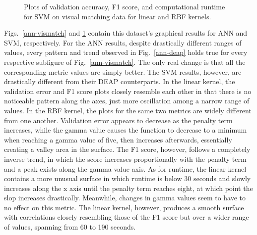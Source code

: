 \documentclass[12pt]{uthesis-v12}  %
\begin{document}
\begin{figure}
	\hfill	
{}
						
\caption{Plots of validation accuracy, F1 score, and computational runtime for SVM on visual matching data for linear and RBF kernels.}
	\label{svm-vismatch}
	\end{figure}
	
Figs.~\ref{ann-vismatch} and \ref{svm-vismatch} contain this dataset's graphical results for ANN and SVM, respectively. For the ANN results, despite drastically different ranges of values, every pattern and trend observed in Fig.~\ref{ann-deap} holds true for every respective subfigure of Fig.~\ref{ann-vismatch}. The only real change is that all the corresponding metric values are simply better. The SVM results, however, are drastically different from their DEAP counterparts. In the linear kernel, the validation error and F1 score plots closely resemble each other in that there is no noticeable pattern along the axes, just more oscillation among a narrow range of values. In the RBF kernel, the plots for the same two metrics are widely different from one another. Validation error appears to decrease as the penalty term increases, while the gamma value causes the function to decrease to a minimum when reaching a gamma value of five, then increases afterwards, essentially creating a valley area in the surface. The F1 score, however, follows a completely inverse trend, in which the score increases proportionally with the penalty term and a peak exists along the gamma value axis. As for runtime, the linear kernel contains a more unusual surface in which runtime is below 30 seconds and slowly increases along the x axis  until the penalty term reaches eight, at which point the slop increases drastically. Meanwhile, changes in gamma values seem to have to no effect on this metric. The linear kernel, however, produces a smooth surface with correlations closely resembling those of the F1 score but over a wider range of values, spanning from 60 to 190 seconds.
\end{document}
